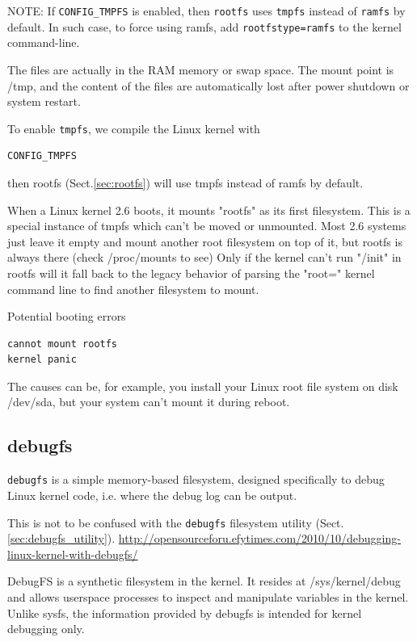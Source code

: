 NOTE: If \verb!CONFIG_TMPFS! is enabled, then \verb!rootfs! uses \verb!tmpfs!
instead of \verb!ramfs! by default. In such case, to force using ramfs, add
\verb!rootfstype=ramfs! to the kernel command-line.

The files are actually in the RAM memory or swap space. The mount point is /tmp,
and the content of the files are automatically lost after power shutdown or
system restart.

To enable \verb!tmpfs!, we compile the Linux kernel with
\begin{verbatim}
CONFIG_TMPFS
\end{verbatim}
then rootfs (Sect.\ref{sec:rootfs}) will use tmpfs instead of ramfs by
default.  


When a Linux kernel 2.6 boots, it mounts "rootfs" as its first filesystem.
This is a special instance of tmpfs which can't be moved or unmounted.
Most 2.6 systems just leave it empty and mount another root filesystem on top of
it, but rootfs is always there (check /proc/mounts to see) 
Only if the kernel can't run "/init" in rootfs will it fall back to the legacy
behavior of parsing the "root=" kernel command line to find another filesystem
to mount.
 

Potential booting errors
\begin{verbatim}
cannot mount rootfs 
kernel panic 
\end{verbatim}
The causes can be, for example, you install your Linux root file system on disk
/dev/sda, but your system can't mount it during reboot. 






\subsection{debugfs}
\label{sec:debugfs}

\verb!debugfs! is a simple memory-based filesystem, designed specifically to
debug Linux kernel code, i.e. where the debug log can be output.

This is not to be confused with the \verb!debugfs! filesystem utility
(Sect.\ref{sec:debugfs_utility}).
\url{http://opensourceforu.efytimes.com/2010/10/debugging-linux-kernel-with-debugfs/}

DebugFS is a synthetic filesystem in the kernel. It resides at
/sys/kernel/debug and allows userspace processes to inspect and manipulate
variables in the kernel. Unlike sysfs, the information provided by debugfs is
intended for kernel debugging only.

